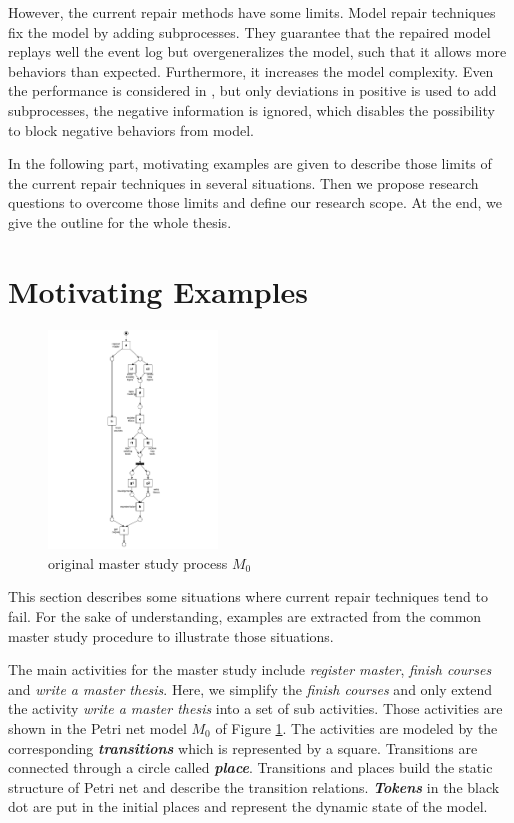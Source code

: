 However, the current repair methods have some limits. Model repair techniques fix the model by adding subprocesses. They guarantee that the repaired model replays well the event log but overgeneralizes the model, such that it allows more behaviors than expected. Furthermore, it increases the model complexity.  Even the performance is considered in \cite{dees2017enhancing}, but only deviations in positive is used to add subprocesses, the negative information is ignored, which disables the possibility to block negative behaviors from model. 

In the following part, motivating examples are given to describe those limits of the current repair techniques in several situations. Then we propose research questions to overcome those limits and define our research scope. At the end, we give the outline for the whole thesis.
\section{Motivating Examples}
\begin{figure}
	\centering
	\includegraphics[clip, trim=7cm 0cm 7cm 0cm, width=0.4\textwidth, height=0.7\textheight]{figures/introduction/Master-original-model.pdf}
	\caption{original master study process $M_0$}
	\label{fig:model_M0}
\end{figure}
This section describes some situations where current repair techniques tend to fail. For the sake of understanding, examples are extracted from the common master study procedure to illustrate those situations.

The main activities for the master study include \emph{register master}, \emph{finish courses} and \emph{write a master thesis}. Here, we simplify the \emph{finish courses} and only extend the activity \emph{write a master thesis} into a set of sub activities. Those activities are shown in the Petri net model $M_0$ of Figure \ref{fig:model_M0}. The activities are modeled by the corresponding \textbf{\emph{transitions}} which is represented by a square. Transitions are connected through a circle called \textbf{\emph{place}}. Transitions and places build the static structure of Petri net and describe the transition relations. \textbf{\emph{Tokens}} in the black dot are put in the initial places and represent the dynamic state of the model. 


